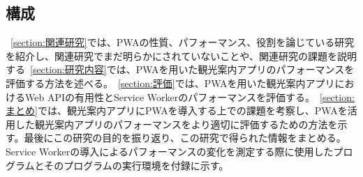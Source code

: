 \subsection{構成}
\label{subsection:構成}
~\autoref{section:関連研究}では、PWAの性質、パフォーマンス、役割を論じている研究を紹介し、関連研究でまだ明らかにされていないことや、関連研究の課題を説明する~\autoref{section:研究内容}では、PWAを用いた観光案内アプリのパフォーマンスを評価する方法を述べる。~\autoref{section:評価}では、PWAを用いた観光案内アプリにおけるWeb APIの有用性とService Workerのパフォーマンスを評価する。~\autoref{section:まとめ}では、観光案内アプリにPWAを導入する上での課題を考察し、PWAを活用した観光案内アプリのパフォーマンスをより適切に評価するための方法を示す。最後にこの研究の目的を振り返り、この研究で得られた情報をまとめる。Service Workerの導入によるパフォーマンスの変化を測定する際に使用したプログラムとそのプログラムの実行環境を付録に示す。